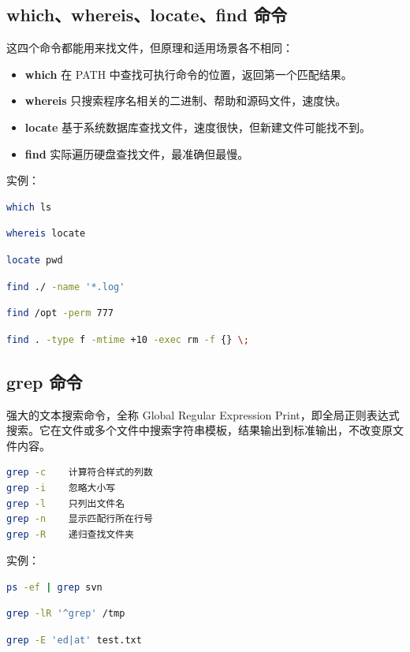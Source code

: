 \documentclass[12pt,a4paper]{ctexbook}
\begin{document}
\subsection{which、whereis、locate、find 命令}
这四个命令都能用来找文件，但原理和适用场景各不相同：
\begin{itemize}
    \item \textbf{which} 在 PATH 中查找可执行命令的位置，返回第一个匹配结果。
    \item \textbf{whereis} 只搜索程序名相关的二进制、帮助和源码文件，速度快。
    \item \textbf{locate} 基于系统数据库查找文件，速度很快，但新建文件可能找不到。
    \item \textbf{find} 实际遍历硬盘查找文件，最准确但最慢。
\end{itemize}
实例：
\begin{lstlisting}[language=bash,title={查看 ls 命令是否存在及其位置}]
    which ls
\end{lstlisting}
\begin{lstlisting}[language=bash,title={查找 locate 程序的相关文件}]
    whereis locate
\end{lstlisting}
\begin{lstlisting}[language=bash,title={查找与 pwd 相关的所有文件}]
    locate pwd
\end{lstlisting}
\begin{lstlisting}[language=bash,title={在当前目录查找以 .log 结尾的文件}]
    find ./ -name '*.log'
\end{lstlisting}
\begin{lstlisting}[language=bash,title={查找 /opt 目录下权限为 777 的文件}]
    find /opt -perm 777
\end{lstlisting}
\begin{lstlisting}[language=bash,title={查找更改时间在 10 日以前的文件并删除(无提示)}]
    find . -type f -mtime +10 -exec rm -f {} \;
\end{lstlisting}

\subsection{grep 命令}
强大的文本搜索命令，全称 Global Regular Expression Print，即全局正则表达式搜索。它在文件或多个文件中搜索字符串模板，结果输出到标准输出，不改变原文件内容。
\begin{lstlisting}[language=bash,title={grep 常用参数}]
grep -c    计算符合样式的列数
grep -i    忽略大小写
grep -l    只列出文件名
grep -n    显示匹配行所在行号
grep -R    递归查找文件夹
\end{lstlisting}
实例：
\begin{lstlisting}[language=bash,title={查找指定进程}]
    ps -ef | grep svn
\end{lstlisting}
\begin{lstlisting}[language=bash,title={从文件夹递归查找以 grep 开头的行, 只列出文件}]
    grep -lR '^grep' /tmp
\end{lstlisting}
\begin{lstlisting}[language=bash,title={显示包含 ed 或 at 内容的行为}]
    grep -E 'ed|at' test.txt
\end{lstlisting}
\end{document}

